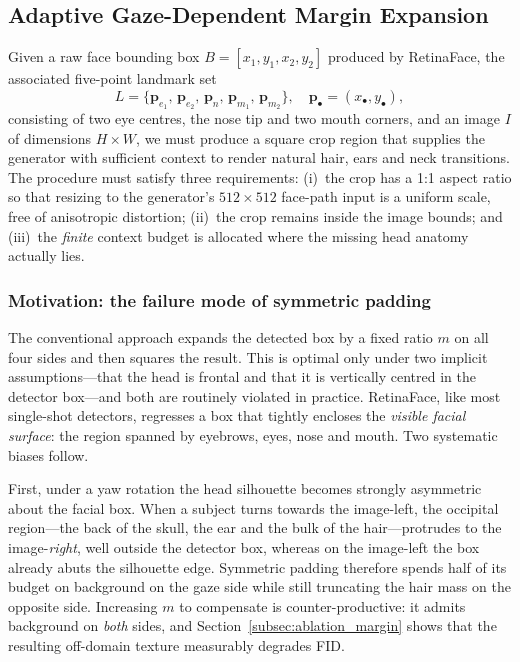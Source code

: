\documentclass[journal]{IEEEtran}
\begin{document}
\subsection{Adaptive Gaze-Dependent Margin Expansion}
\label{subsec:margin}

Given a raw face bounding box $B = [x_1, y_1, x_2, y_2]$ produced by RetinaFace, the associated five-point landmark set
\begin{equation}
L = \{\mathbf{p}_{e_1},\, \mathbf{p}_{e_2},\, \mathbf{p}_{n},\, \mathbf{p}_{m_1},\, \mathbf{p}_{m_2}\}, \quad \mathbf{p}_\bullet = (x_\bullet, y_\bullet),
\label{eq:landmarks}
\end{equation}
consisting of two eye centres, the nose tip and two mouth corners, and an image $I$ of dimensions $H \times W$, we must produce a square crop region that supplies the generator with sufficient context to render natural hair, ears and neck transitions. The procedure must satisfy three requirements: (i)~the crop has a 1:1 aspect ratio so that resizing to the generator's $512 \times 512$ face-path input is a uniform scale, free of anisotropic distortion; (ii)~the crop remains inside the image bounds; and (iii)~the \emph{finite} context budget is allocated where the missing head anatomy actually lies.

\subsubsection{Motivation: the failure mode of symmetric padding}
The conventional approach expands the detected box by a fixed ratio $m$ on all four sides and then squares the result. This is optimal only under two implicit assumptions---that the head is frontal and that it is vertically centred in the detector box---and both are routinely violated in practice. RetinaFace, like most single-shot detectors, regresses a box that tightly encloses the \textit{visible facial surface}: the region spanned by eyebrows, eyes, nose and mouth. Two systematic biases follow.

First, under a yaw rotation the head silhouette becomes strongly asymmetric about the facial box. When a subject turns towards the image-left, the occipital region---the back of the skull, the ear and the bulk of the hair---protrudes to the image-\textit{right}, well outside the detector box, whereas on the image-left the box already abuts the silhouette edge. Symmetric padding therefore spends half of its budget on background on the gaze side while still truncating the hair mass on the opposite side. Increasing $m$ to compensate is counter-productive: it admits background on \textit{both} sides, and Section~\ref{subsec:ablation_margin} shows that the resulting off-domain texture measurably degrades FID.
\end{document}
